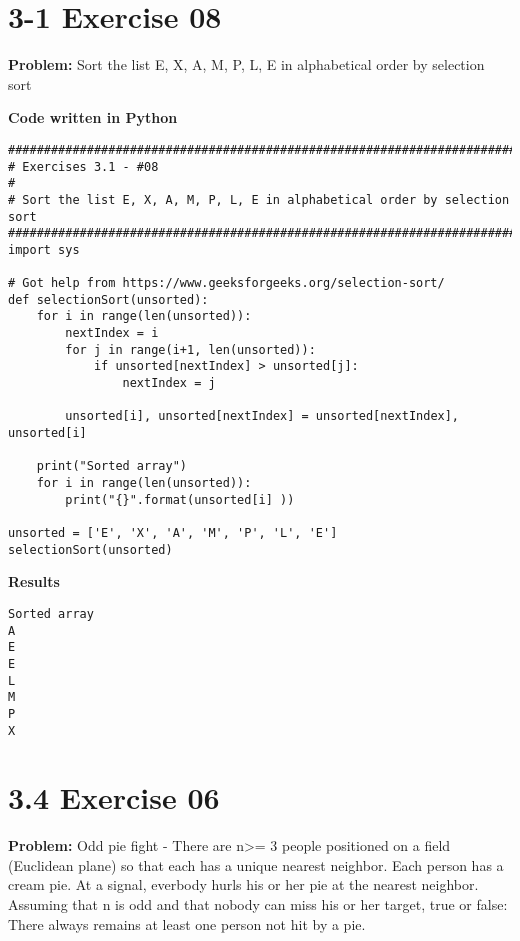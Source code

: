 \documentclass[paper=a4, fontsize=11pt]{scrartcl} %
\numberwithin{equation}{section}
\numberwithin{figure}{section}
\numberwithin{table}{section}
\begin{document}
\section{3-1 Exercise 08}

\textbf{Problem:} Sort the list E, X, A, M, P, L, E in alphabetical order by selection sort

\bigskip
\textbf{Code written in Python}
\begin{lstlisting}
############################################################################
# Exercises 3.1 - #08
# 
# Sort the list E, X, A, M, P, L, E in alphabetical order by selection sort
############################################################################
import sys

# Got help from https://www.geeksforgeeks.org/selection-sort/
def selectionSort(unsorted):
    for i in range(len(unsorted)):
        nextIndex = i
        for j in range(i+1, len(unsorted)):
            if unsorted[nextIndex] > unsorted[j]:
                nextIndex = j

        unsorted[i], unsorted[nextIndex] = unsorted[nextIndex], unsorted[i]

    print("Sorted array")
    for i in range(len(unsorted)):
        print("{}".format(unsorted[i] ))

unsorted = ['E', 'X', 'A', 'M', 'P', 'L', 'E']
selectionSort(unsorted)
\end{lstlisting}

\textbf{Results}
\begin{lstlisting}
Sorted array
A
E
E
L
M
P
X
\end{lstlisting}

\pagebreak


\section{3.4 Exercise 06}

\textbf{Problem:} Odd pie fight - There are n>= 3 people positioned on a field (Euclidean plane) so that each has a unique nearest neighbor. Each person has a cream pie. At a signal, everbody hurls his or her pie at the nearest neighbor. Assuming that n is odd and that nobody can miss his or her target, true or false: There always remains at least one person not hit by a pie.
\end{document}
